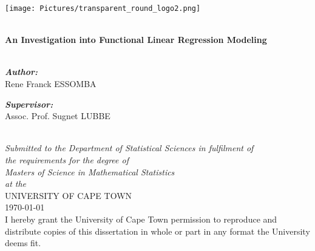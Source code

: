 \documentclass[11pt, a4paper, oneside]{Thesis} %
\begin{document}
\begin{titlepage}
\begin{center}
\texttt{[image: Pictures/transparent\_round\_logo2.png]}

\HRule \\[0.4cm] %
{\huge \bfseries An Investigation into Functional Linear Regression Modeling}\\[0.4cm] %
\HRule \\[1.5cm] %
 
\begin{minipage}{0.4\textwidth}
\begin{flushleft} \large
\textit{\textbf{Author:}}\\
{Rene Franck ESSOMBA} %
\end{flushleft}
\end{minipage}
\begin{minipage}{0.4\textwidth}
\begin{flushright} \large
\textit{\textbf{Supervisor:}} \\
{Assoc. Prof. Sugnet LUBBE} %
\end{flushright}
\end{minipage}\\[2cm]
 
\large \textit{Submitted to the Department of Statistical Sciences in fulfilment of\\ the requirements for the degree of\\ Masters of Science in Mathematical Statistics}\\[0.3cm] %
\textit{at the}\\[0.4cm]
UNIVERSITY OF CAPE TOWN\\[1cm] %
 
{\large \today}\\[3cm] %
 
\vspace*{-2cm}
I hereby grant the University of Cape Town permission to reproduce and distribute copies of this dissertation in whole or part in any format the University deems fit.
\end{center}

\end{titlepage}
\end{document}
